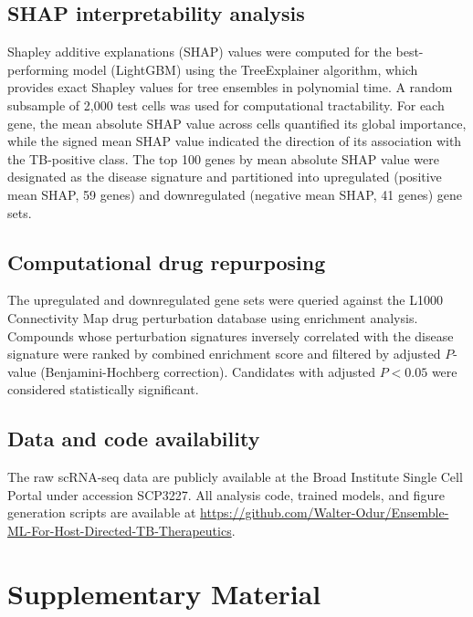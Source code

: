 \documentclass[12pt]{article}
\begin{document}
\subsection*{SHAP interpretability analysis}

Shapley additive explanations (SHAP) values were computed for the best-performing model (LightGBM) using the TreeExplainer algorithm\cite{lundberg2020}, which provides exact Shapley values for tree ensembles in polynomial time. A random subsample of 2,000 test cells was used for computational tractability. For each gene, the mean absolute SHAP value across cells quantified its global importance, while the signed mean SHAP value indicated the direction of its association with the TB-positive class. The top 100 genes by mean absolute SHAP value were designated as the disease signature and partitioned into upregulated (positive mean SHAP, 59 genes) and downregulated (negative mean SHAP, 41 genes) gene sets.

\subsection*{Computational drug repurposing}

The upregulated and downregulated gene sets were queried against the L1000 Connectivity Map drug perturbation database\cite{subramanian2017} using enrichment analysis. Compounds whose perturbation signatures inversely correlated with the disease signature were ranked by combined enrichment score and filtered by adjusted $P$-value (Benjamini-Hochberg correction). Candidates with adjusted $P < 0.05$ were considered statistically significant.

\subsection*{Data and code availability}

The raw scRNA-seq data are publicly available at the Broad Institute Single Cell Portal under accession SCP3227. All analysis code, trained models, and figure generation scripts are available at \url{https://github.com/Walter-Odur/Ensemble-ML-For-Host-Directed-TB-Therapeutics}.




\clearpage
\section*{Supplementary Material}
\end{document}
